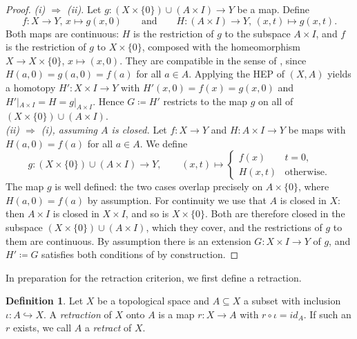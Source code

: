 \documentclass[11pt, a4paper, english]{article}
\theoremstyle{plain}
\theoremstyle{definition}
\newtheorem{definition}[theorem]{Definition}
\theoremstyle{remark}
\numberwithin{equation}{section}
\numberwithin{theorem}{section}
\begin{document}
\begin{proof} 
    \emph{(i) $\Rightarrow$ (ii).} 
    Let $g \colon (X \times \{ 0\}) \cup (A \times I) \to Y$ be a map. Define
    \[ 
    f \colon X \to Y, \, x \mapsto g(x,0)
    \qquad\text{and}\qquad
    H \colon (A \times I) \to Y, \, (x,t) \mapsto g(x,t).
    \] 
    Both maps are continuous: $H$ is the restriction of $g$ to the subspace $A \times I$, and $f$ is the restriction of $g$ to $X \times \{0\}$, composed with the homeomorphism $X \to X \times \{0\}$, $x \mapsto (x,0)$. They are compatible in the sense of , since $H(a,0) = g(a,0) = f(a)$ for all $a \in A$. Applying the HEP of $(X,A)$ yields a homotopy $H' \colon X \times I \to Y$ with $H'(x,0) = f(x) = g(x,0)$ and $H'|_{A \times I} = H = g|_{A \times I}$. Hence $G \coloneqq H'$ restricts to the map $g$ on all of $(X \times \{0\}) \cup (A \times I)$. \\
    \emph{(ii) $\Rightarrow$ (i), assuming $A$ is closed.}
    Let $f \colon X \to Y$ and $ H \colon A \times I \to Y$ be maps with $H(a,0) = f(a)$ for all $a \in A$. We define
    \[
    g \colon (X \times \{ 0\}) \cup (A \times I) \rightarrow Y, 
    \qquad
    (x,t) \mapsto \begin{cases}
        f(x) & t = 0, \\
        H(x,t) & \text{otherwise.}
        \end{cases}
    \]
    The map $g$ is well defined: the two cases overlap precisely on $A \times \{0\}$, where $H(a,0) = f(a)$ by assumption. For continuity we use that $A$ is closed in $X$: then $A \times I$ is closed in $X \times I$, and so is $X \times \{0\}$. Both are therefore closed in the subspace $(X \times \{0\}) \cup (A \times I)$, which they cover, and the restrictions of $g$ to them are continuous. By assumption there is an extension $G \colon X \times I \to Y$ of $g$,  and $H' \coloneqq G$ satisfies both conditions of  by construction.
\end{proof}

In preparation for the retraction criterion, we first define a retraction.

\begin{definition} \label{def:retraction}
    Let $X$ be a topological space and $A \subseteq X$ a subset with inclusion $ \iota : A \hookrightarrow X $. A \emph{retraction} of $X$ onto $A$ is a map $r \colon X \to A$ with $r \circ \iota = id_A $. If such an $r$ exists, we call $A$ a \emph{retract} of $X$.
\end{definition}
\end{document}
